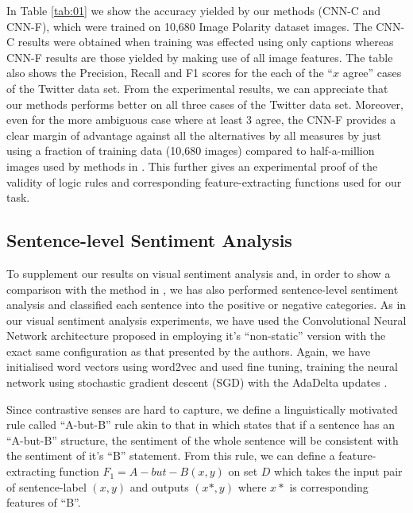\documentclass[12pt,a4paper]{article}
\begin{document}
In Table \ref{tab:01} we show the accuracy yielded by our methods (CNN-C and CNN-F), which were trained on 10,680 Image Polarity dataset images. The CNN-C results were obtained when training was effected using only captions whereas CNN-F results are those yielded by making use of all image features. 
The table also shows the Precision, Recall and F1 scores for the each of the ``$x$ agree'' cases of the Twitter data set. From the experimental results, we can appreciate that our methods performs better on all three cases of the Twitter data set. Moreover, even for the more ambiguous case where at least 3 agree, the CNN-F provides a clear margin of advantage against all the alternatives by all measures by just using a fraction of training data (10,680 images) compared to half-a-million images used by methods in \cite{You:2015}. This further gives an experimental proof of the validity of logic rules and corresponding feature-extracting functions used for our task.
\vspace{2mm}

\subsection{Sentence-level Sentiment Analysis}

To supplement our results on visual sentiment analysis and, in order to show a comparison with the method in \cite{Hu:2019}, we has also performed sentence-level sentiment analysis and classified each sentence into the positive or negative categories. As in our visual sentiment analysis experiments, we have used the Convolutional Neural Network architecture proposed in \cite{Kim:2014} employing it's ``non-static'' version with the exact same configuration as that presented by the authors. Again, we have initialised word vectors using word2vec \cite{Mikolov:2014} and used fine tuning, training the neural network using stochastic gradient descent (SGD) with the AdaDelta updates \cite{Zeiler:2012}.
\vspace{2mm}

Since contrastive senses are hard to capture, we define a linguistically motivated rule called ``A-but-B'' rule akin to that in \cite{Hu:2019} which states that if a sentence has an ``A-but-B'' structure, the sentiment of the whole sentence will be consistent with the sentiment of it's ``B'' statement. From this rule, we can define a feature-extracting function \begin{math}F_1 = A-but-B(x,y)\end{math} on set $D$ which takes the input pair of sentence-label $(x,y)$ and outputs $(x*,y)$ where $x*$ is corresponding features of ``B''.
\vspace{2mm}
\end{document}

